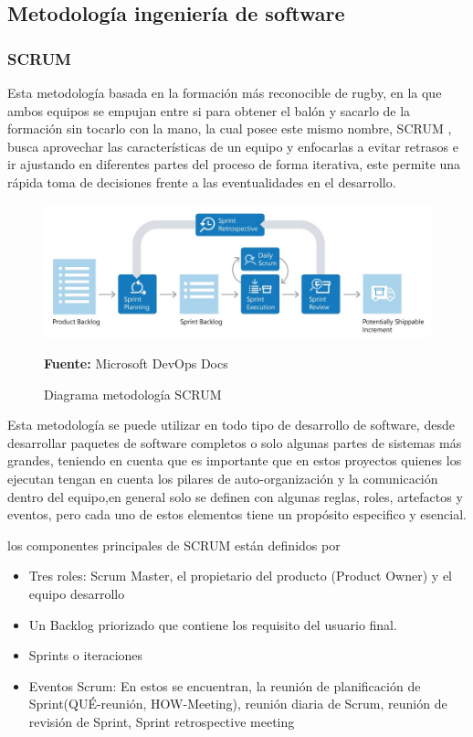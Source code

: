 \subsection{Metodología ingeniería de software}
\subsubsection{SCRUM}

Esta metodología basada en la formación más reconocible de rugby, en la que ambos equipos se empujan entre si para obtener el balón y sacarlo de la formación sin tocarlo con la mano, la cual posee este mismo nombre, SCRUM \parencite{AlexanderMenzinskyGertrudisLopez2016ScrumManage}, busca aprovechar las características de un equipo y enfocarlas a evitar retrasos  e ir ajustando en diferentes partes del proceso de forma iterativa, este permite una rápida toma de decisiones frente a las eventualidades en el desarrollo.

\begin{figure}[H]
    \centering
    \includegraphics[width=1\textwidth]{Anexos/LATEX/chapters/images/scrum.jpg}
    \caption{Diagrama metodología SCRUM}
    \small{\textbf{Fuente:} Microsoft DevOps Docs}
    \label{SCRUM}
\end{figure}

Esta metodología se puede utilizar en todo tipo de desarrollo de software, desde desarrollar paquetes de software completos o solo algunas partes de sistemas más grandes, teniendo en cuenta que es importante que en estos proyectos quienes los ejecutan tengan en cuenta los pilares de auto-organización y la comunicación dentro del equipo,en general solo se definen con algunas reglas, roles, artefactos y eventos, pero cada uno de estos elementos tiene un propósito especifico y esencial.

los componentes principales de SCRUM están definidos por 
\begin{itemize}
    \item Tres roles: Scrum Master, el propietario del producto (Product Owner) y el equipo desarrollo
    \item Un Backlog priorizado que contiene los requisito del usuario final.
    \item Sprints o iteraciones
    \item Eventos Scrum: En estos se encuentran, la reunión de planificación de Sprint(QUÉ-reunión, HOW-Meeting), reunión diaria de Scrum, reunión de revisión de Sprint, Sprint retrospective meeting 
\end{itemize}

